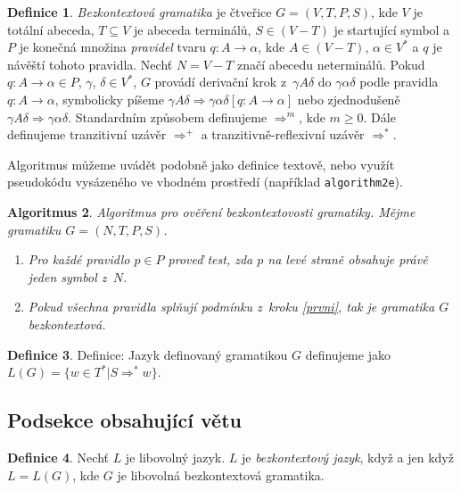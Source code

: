 \documentclass[11pt,a4paper,twocolumn]{article}
\theoremstyle{plain}
\newtheorem{theorem}{Algoritmus}[section]
\theoremstyle{definition}
\newtheorem{bg}[theorem]{Definice}
\theoremstyle{plain}
\begin{document}
    \begin{bg} \label{bezkontextovaGramatika}
      \emph{Bezkontextová gramatika} je čtveřice $G=(V,T,P,S)$, kde $V$ je
      totální abeceda,
      $T \subseteq V$ je abeceda terminálů, $S \in (V-T)$ je startující symbol
      a $P$ je konečná množina \emph{pravidel} tvaru $q:A\rightarrow\alpha$,
      kde $A \in (V-T)$, $\alpha \in V^{*}$ a $q$ je návěští tohoto pravidla. 
      Nechť $N=V-T$ značí abecedu neterminálů. Pokud $q: A \rightarrow \alpha
      \in P$, $\gamma$, $\delta \in V^{*}$, $G$ provádí derivační krok z~$\gamma
      A \delta$ do $\gamma \alpha \delta$ podle pravidla $q:A \rightarrow
      \alpha$, symbolicky píšeme $\gamma A \delta \Rightarrow \gamma \alpha
      \delta [q:A \rightarrow \alpha]$ nebo zjednodušeně $\gamma A \delta
      \Rightarrow \gamma \alpha \delta$. Standardním způsobem definujeme
      $\Rightarrow^{m}$, kde $m \geq 0$. Dále definujeme tranzitivní uzávěr
      $\Rightarrow^{+}$ a tranzitivně-reflexivní uzávěr $\Rightarrow^{*}$.
    \end{bg}

    Algoritmus můžeme uvádět podobně jako definice textově, nebo využít
    pseudokódu vysázeného ve vhodném prostředí (například
    \texttt{algorithm2e}).

    \begin{theorem}
      Algoritmus pro ověření bezkontextovosti gramatiky. Mějme gramatiku 
      $G = (N, T, P, S)$.
      \begin{enumerate}
        \item \label{prvni}Pro každé pravidlo $p \in P$ proveď test, zda $p$ na
          levé straně obsahuje právě jeden symbol z~$N$.
        \item Pokud všechna pravidla splňují podmínku z~kroku \ref{prvni}, 
        tak je gramatika $G$ bezkontextová.
      \end{enumerate}
    \end{theorem}

    \begin{bg}
      Definice: Jazyk definovaný gramatikou $G$ definujeme jako
      $L(G)=\{w \in T^{*}|S \Rightarrow^{*}w\}$.
    \end{bg}

    \subsection{Podsekce obsahující větu}

      \begin{bg}
        Nechť $L$ je libovolný jazyk. $L$ je \emph{bezkontextový jazyk}, když a
        jen když $L=L(G)$, kde $G$ je libovolná bezkontextová gramatika.
      \end{bg}
\end{document}

